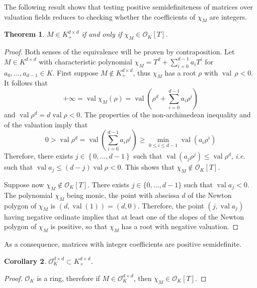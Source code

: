 \documentclass[a4paper,oneside,11pt]{article}
\newtheorem{theorem}{Theorem}[section]
\newtheorem{corollary}[theorem]{Corollary}
\DeclareMathOperator{\val}{val}
\newcommand{\OK}{\mathcal{O}_K}
\begin{document}
The following result shows that testing positive semidefiniteness of matrices over
valuation fields reduces to checking whether the coefficients of $\chi_M$ are integers.

\begin{theorem}
  \label{caracsdp}
  $M \in K^{d\times d}_+$ if and only if $\chi_M \in \OK[T]$.
\end{theorem}
\begin{proof}
  Both senses of the equivalence will be proven by contraposition.
  Let $M \in K^{d\times d}$ with characteristic polynomial $\chi_M = T^d + \sum_{i=0}^{d-1} a_i T^i$ for $a_0,...,a_{d-1} \in K$.
  First suppose $M \not \in K^{d\times d}_+$, thus $\chi_M$ has a root $\rho$ with $\val\,\rho<0$.
  It follows that
  $$
  + \infty = \val \chi_M (\rho) = \val \left(\rho^d+ \sum_{i=0}^{d-1} a_i \rho^i\right)
  $$ and $\val \rho^d = d \val \rho <0$.
  The properties of the non-archimedean inequality and of the valuation imply that
  $$
  0> \val \rho^d = \val\left(\sum_{i=0}^{d-1} a_i \rho^i\right) \geq
  \min_{0 \leq i \leq d-1} \val \left(a_i \rho^i\right)
  $$
  Therefore, there exists $j \in \left\{0,...,d-1\right\}$ such that $\val(a_j \rho^j) \le \val\rho^d$,
  {\it i.e.} such that $\val a_j \le (d-j) \val \rho <0$. This shows that $\chi_M \not\in \OK[T]$.
  

  Suppose now $\chi_M \not\in \OK[T]$. There exists $j \in \{0,...,d-1\}$ such that $\val a_j <0$.
  The polynomial $\chi_M$ being monic, the point with abscissa $d$ of the Newton polygon of $\chi_M$ is
  $(d,\val(1)) = (d,0)$. 
  Therefore, the point $(j, \val a_j)$ having negative ordinate implies that at least one of the slopes of
  the Newton polygon of $\chi_M$ is positive, so that $\chi_M$ has a root with negative valuation.
\end{proof}

As a consequence, matrices with integer coefficients are positive semidefinite.

\begin{corollary}\label{cor_caracsdp}
  $\OK^{d\times d} \subset K^{d\times d}_+$.
\end{corollary}
\begin{proof}
  $\OK$ is a ring, therefore if $M \in \OK^{d \times d}$, then $\chi_M \in \OK[T]$.
\end{proof}
\end{document}
